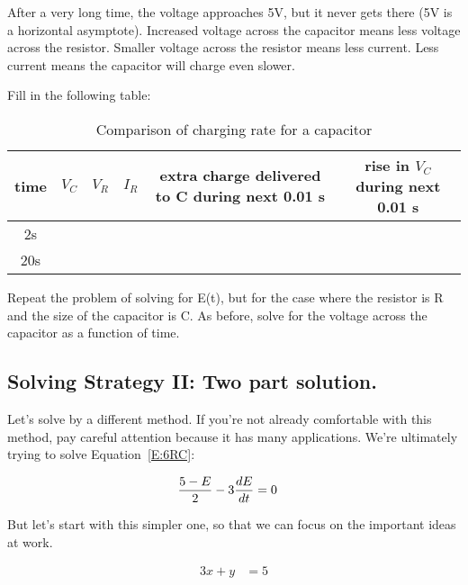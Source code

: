 After a very long time, the voltage approaches 5V, but it never gets there (5V is a horizontal asymptote). Increased voltage across the capacitor means less voltage across the resistor. Smaller voltage across the resistor means less current. Less current means the capacitor will charge even slower.

\begin{clevel}
Fill in the following table:
\end{clevel}

\begin{table}[H]
\begin{center}
\begin{tabular}{|c|c|c|c|c|c|} \hline
time&$V_C$&$V_R$&$I_R$&extra charge delivered to C during next 0.01 s&rise in $V_C$ during next 0.01 s \\ \hline
2s&&&&& \\ \hline
20s&&&&& \\ \hline
\end{tabular}
\caption{Comparison of charging rate for a capacitor}
\end{center}
\end{table}

\begin{clevel}
Repeat the problem of solving for E(t), but for the case where the resistor is R and the size of the capacitor is C. As before, solve for the voltage across the capacitor as a function of time.
\end{clevel}

\subsection{Solving Strategy II: Two part solution.}
Let's solve by a different method. If you're not already comfortable with this method, pay careful attention because it has many applications. We're ultimately trying to solve Equation~\eqref{E:6RC}:

\begin{align}
\frac{5-E}{2}-3\frac{dE}{dt}&=0 \notag
\end{align}

But let's start with this simpler one, so that we can focus on the important ideas at work.

\begin{align}
3x+y&=5
\end{align}

